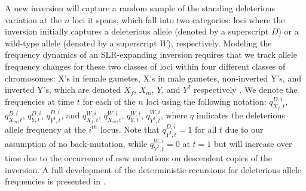 \documentclass{article}[12pt]
\begin{document}
A new inversion will capture a random sample of the standing deleterious variation at the $n$ loci it spans, which fall into two categories: loci where the inversion initially captures a deleterious allele (denoted by a superscript $D$) or a wild-type allele (denoted by a superscript $W$), respectively. Modeling the frequency dynamics of an SLR-expanding inversion requires that we track allele frequency changes for these two classes of loci within four different classes of chromosomes: X's in female gametes, X's in male gametes, non-inverted Y's, and inverted Y's, which are denoted $X_f$, $X_m$, $Y$, and $Y^I$ respectively \citep[see][]{Otto2014,Olito-etal-2022}. We denote the frequencies at time $t$ for each of the $n$ loci using the following notation: $q_{X_f,t}^{D,i}$, $q_{X_m,t}^{D,i}$, $q_{Y,t}^{D,i}$, $q_{Y^I,t}^{D,i}$, and $q_{X_f,t}^{W,i}$, $q_{X_m,t}^{W,i}$, $q_{Y,t}^{W,i}$, $q_{Y^I,t}^{W,i}$, where $q$ indicates the deleterious allele frequency at the $i^{th}$ locus. Note that $q_{Y^I,t}^{D,i} = 1$ for all $t$ due to our assumption of no back-mutation, while $q_{Y^I,t}^{W,i} = 0$ at $t=1$ but will increase over time due to the occurrence of new mutations on descendent copies of the inversion. A full development of the deterministic recursions for deleterious allele frequencies is presented in \citep{Olito-etal-2022}. 
\end{document}

